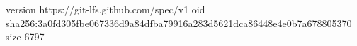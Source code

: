 version https://git-lfs.github.com/spec/v1
oid sha256:3a0fd305fbe067336d9a84dfba79916a283d5621dca86448e4e0b7a678805370
size 6797
